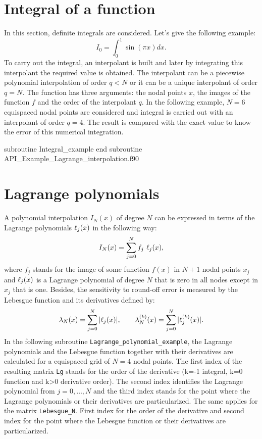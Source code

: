 \section{Integral of a function} 
In this section,  definite integrals are considered. Let's give the following example: 
$$
   I_0 = \int _{0} ^{1}  \sin ( \pi x) dx.
$$
To carry out the integral, an interpolant is built and later by integrating
this interpolant the required value is obtained.  The interpolant can be a piecewise polynomial interpolation of order $ q < N $  or it can be a unique interpolant of order $ q = N $. 
The function  has three arguments: the nodal points $x$, the images of the function $ f $ and the order of the interpolant $q$. 
In the  following example,  $ N =6 $ equispaced nodal points are considered and integral is carried out with an interpolant of order $ q = 4$.  
The result is compared with the exact value to know the error of this numerical integration. 

\vspace{0.2cm} 
         {subroutine Integral_example}
         {end subroutine}
         {API_Example_Lagrange_interpolation.f90}


\section{Lagrange polynomials} 

A polynomial interpolation $ I_N(x) $ of degree $ N $  can be expressed in terms of the Lagrange polynomials $\ell_j(x)$ in the following way: 
$$
    I_N(x) = \sum _{j=0} ^{N} f_j \ \lagrange_j(x), 
$$
where $ f_j $ stands for the image of some function $ f(x) $ in $ N+1$ nodal points $ x_j $ and $ \ell_j(x) $ is a Lagrange polynomial of degree $ N $ that is zero in all nodes except in $ x_j $  
that is one. 
Besides, the sensitivity to round-off error is measured by the Lebesgue function and its derivatives defined by: 
$$
    \lambda_N (x )=  \sum _{ j=0} ^{ N} | \ell_j(x) |, \qquad   \lambda^{(k)} _N (x )=  \sum _{ j=0} ^{ N} | \ell^{(k)}_j(x) |.
$$
In the following subroutine \verb|Lagrange_polynomial_example|, the  Lagrange polynomials and the Lebesgue function together with their derivatives are calculated for a equispaced grid of $ N=4 $ nodal points. 
The first index of the resulting matrix \verb|Lg| stands for the order of the derivative (k=-1 integral, k=0 function and k>0 derivative order). 
The second index identifies the Lagrange polynomial from $ j=0, \ldots, N $ and the third index stands for the 
point where the Lagrange polynomials or their derivatives are particularized. The same applies for the matrix \verb|Lebesgue_N|. First index for the order of the derivative and second index for the point where the Lebesgue function or their derivatives are particularized. 

